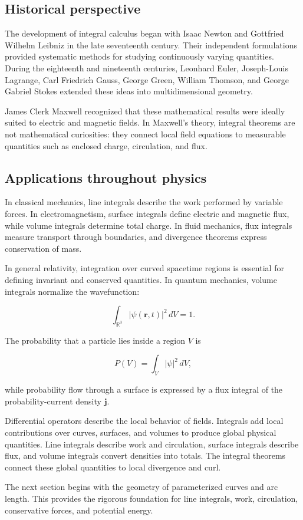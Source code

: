 \subsection{Historical perspective}

The development of integral calculus began with Isaac Newton and Gottfried
Wilhelm Leibniz in the late seventeenth century. Their independent formulations
provided systematic methods for studying continuously varying quantities.
During the eighteenth and nineteenth centuries, Leonhard Euler, Joseph-Louis
Lagrange, Carl Friedrich Gauss, George Green, William Thomson, and George
Gabriel Stokes extended these ideas into multidimensional geometry.

James Clerk Maxwell recognized that these mathematical results were ideally
suited to electric and magnetic fields. In Maxwell's theory, integral theorems
are not mathematical curiosities: they connect local field equations to
measurable quantities such as enclosed charge, circulation, and flux.

\subsection{Applications throughout physics}

In classical mechanics, line integrals describe the work performed by variable
forces. In electromagnetism, surface integrals define electric and magnetic
flux, while volume integrals determine total charge. In fluid mechanics, flux
integrals measure transport through boundaries, and divergence theorems express
conservation of mass.

In general relativity, integration over curved spacetime regions is essential
for defining invariant and conserved quantities. In quantum mechanics, volume
integrals normalize the wavefunction:

\begin{equation}
  \boxed{\int_{\mathbb R^3}\lvert\psi(\mathbf r,t)\rvert^2\,dV=1.}
\end{equation}

The probability that a particle lies inside a region $V$ is

\begin{equation}
  P(V)=\int_V \lvert\psi\rvert^2\,dV,
\end{equation}

while probability flow through a surface is expressed by a flux integral of
the probability-current density $\mathbf j$.

\begin{summarybox}
Differential operators describe the local behavior of fields. Integrals add
local contributions over curves, surfaces, and volumes to produce global
physical quantities. Line integrals describe work and circulation, surface
integrals describe flux, and volume integrals convert densities into totals.
The integral theorems connect these global quantities to local divergence and
curl.
\end{summarybox}

\begin{lookingaheadbox}
The next section begins with the geometry of parameterized curves and arc
length. This provides the rigorous foundation for line integrals, work,
circulation, conservative forces, and potential energy.
\end{lookingaheadbox}
